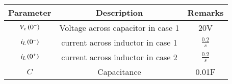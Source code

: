 \setlength{\arrayrulewidth}{0.3mm}
\setlength{\tabcolsep}{20pt}
\renewcommand{\arraystretch}{1.3}



\begin{tabular}{|c|c|c|}
\hline

Parameter& Description & Remarks\\
\hline
$V_c\left(0^{-}\right)$ & Voltage across capacitor in case 1 & 20V\\
\hline
$i_L \left(0^-\right)$ & current across inductor in case 1  & $\frac{0.2}{s} $  \\
\hline
$i_L \left(0^+\right)$ & current across inductor in case 2 & $\frac{0.2}{s} $\\
\hline
$C$ & Capacitance & 0.01F\\
\hline

\end{tabular}

